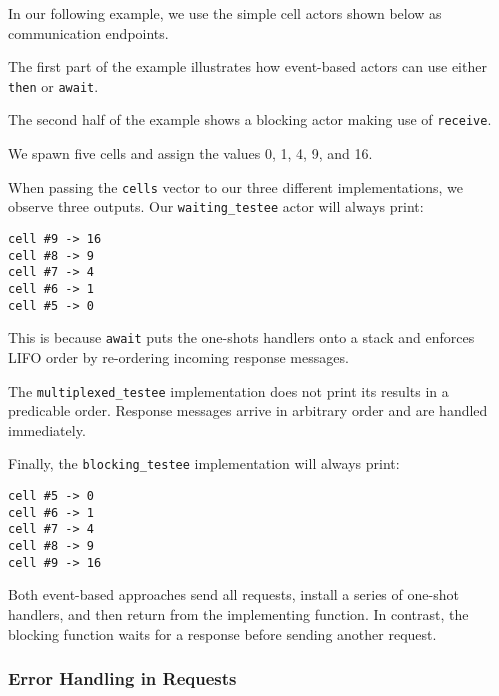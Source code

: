 \clearpage
In our following example, we use the simple cell actors shown below as communication endpoints.



The first part of the example illustrates how event-based actors can use either \lstinline^then^ or \lstinline^await^.



The second half of the example shows a blocking actor making use of \lstinline^receive^.



We spawn five cells and assign the values 0, 1, 4, 9, and 16.



When passing the \lstinline^cells^ vector to our three different implementations, we observe three outputs. Our \lstinline^waiting_testee^ actor will always print:

{\footnotesize\begin{verbatim}
cell #9 -> 16
cell #8 -> 9
cell #7 -> 4
cell #6 -> 1
cell #5 -> 0
\end{verbatim}}

This is because \lstinline^await^ puts the one-shots handlers onto a stack and enforces LIFO order by re-ordering incoming response messages.

The \lstinline^multiplexed_testee^ implementation does not print its results in a predicable order. Response messages arrive in arbitrary order and are handled immediately.

Finally, the \lstinline^blocking_testee^ implementation will always print:

{\footnotesize\begin{verbatim}
cell #5 -> 0
cell #6 -> 1
cell #7 -> 4
cell #8 -> 9
cell #9 -> 16
\end{verbatim}}

Both event-based approaches send all requests, install a series of one-shot handlers, and then return from the implementing function. In contrast, the blocking function waits for a response before sending another request.

\subsubsection{Error Handling in Requests}
\label{error-response}

